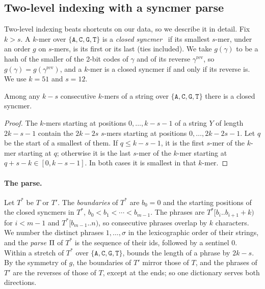 \subsection{Two-level indexing with a syncmer parse}
\label{sec:twolevel}

Two-level indexing beats shortcuts on our data, so we describe it in
detail. Fix $k > s$. A $k$-mer over
$\{\texttt{A},\texttt{C},\texttt{G},\texttt{T}\}$ is a \emph{closed
syncmer}~\cite{Edgar2021} if its smallest $s$-mer, under an order $g$ on
$s$-mers, is its first or its last (ties included). We take $g(\gamma)$
to be a hash of the smaller of the 2-bit codes of $\gamma$ and of its
reverse $\gamma^{\mathrm{rev}}$, so $g(\gamma) =
g(\gamma^{\mathrm{rev}})$, and a $k$-mer is a closed syncmer if and only
if its reverse is. We use $k = 51$ and $s = 12$.

\begin{lemma}
\label{lem:window}
Among any $k - s$ consecutive $k$-mers of a string over
$\{\texttt{A},\texttt{C},\texttt{G},\texttt{T}\}$ there is a closed
syncmer.
\end{lemma}

\begin{proof}
The $k$-mers starting at positions $0, \ldots, k - s - 1$ of a string
$Y$ of length $2k - s - 1$ contain the $2k - 2s$ $s$-mers starting at
positions $0, \ldots, 2k - 2s - 1$. Let $q$ be the start of a smallest
of them. If $q \le k - s - 1$, it is the first $s$-mer of the $k$-mer
starting at $q$; otherwise it is the last $s$-mer of the $k$-mer
starting at $q + s - k \in [0, k - s - 1]$. In both cases it is
smallest in that $k$-mer.
\end{proof}

\paragraph*{The parse.}
Let $T^*$ be $T$ or $T'$. The \emph{boundaries} of $T^*$ are $b_0 = 0$ and
the starting positions of the closed syncmers in $T^*$, $b_0 < b_1 <
\cdots < b_{m-1}$. The phrases are $T^*[b_i .. b_{i+1} + k)$ for $i < m -
1$ and $T^*[b_{m-1} .. n)$, so consecutive phrases overlap by $k$
characters. We number the distinct phrases $1, \ldots, \sigma$ in the
lexicographic order of their strings, and the \emph{parse} $\Pi$ of
$T^*$ is the sequence of their ids, followed by a sentinel $0$. Within a
stretch of $T^*$ over $\{\texttt{A},\texttt{C},\texttt{G},\texttt{T}\}$,
 bounds the length of a phrase by $2k - s$. By
the symmetry of $g$, the boundaries of $T'$ mirror those of $T$, and
the phrases of $T'$ are the reverses of those of $T$, except at the
ends; so one dictionary serves both directions.

